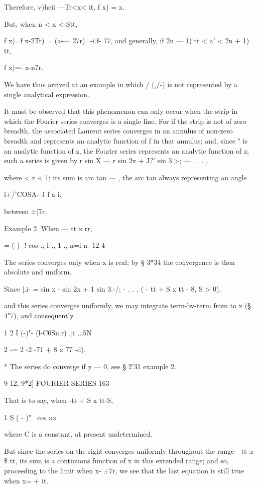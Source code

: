Therefore, v)heii —Tr<x< it, f x) = x.

But, when n < x < Stt,

f x)=f x-2Tr) = (a-— 27r)=-i.f- 77, and generally, if 2n — 1) tt < a'
< 2n + 1) tt,

f x)=- x-n7r.

We have thus arrived at an example in which / (,/-) is not represented
by a single analytical expression.

It must be observed that this phenomenon can only occur when the strip
in which the Fourier series converges is a single line. For if the
strip is not of zero breadth, the associated Laurent series converges
in an annulus of non-zero breadth and represents an analytic function
of f in that annulus; and, since " is an analytic function of z, the
Fourier series represents an analytic function of z; such a series is
given by r sin X — r sin 2x + J?' sin 3.>; — . . . ,

where < r < 1; its sum is arc tan — , the arc tan always representing
an angle

l+/'COSA- J f a i,

between ±|7r.

Example 2. When — tt x rr,

= (-) -! cos .; I ., 1 ., n=i n- 12 4

The series converges only when x is real; by § 3*34 the convergence
is then absolute and uniform.

Since |.i- = sin x - sin 2x + 1 sin 3.-/; - . . . ( - tt + S x tt - 8,
S > 0),

and this series converges uniformly, we may integrate term-bv-term
from to x (§ 4"7), and consequently

1 2 I (-)"- (l-C0Sn.r) ,;i ,,;5N

2 -= 2 -2 -71 + 8 x 77 -d).

* The series do converge if y — 0, see § 2'31 example 2.

9-12, 9*2] FOURIER SERIES 163

That is to say, when -tt + S x tt-S,

  1 S ( - )"~ cos nx

where C is a constant, at present undetermined.

But since the series on the right converges uniformly throughout the
range - tt :r \$ tt, its sum is a continuous function of x in this
extended range; and so, proceeding to the limit when x- ±7r, we see
that the last equation is still true when x= + it.

